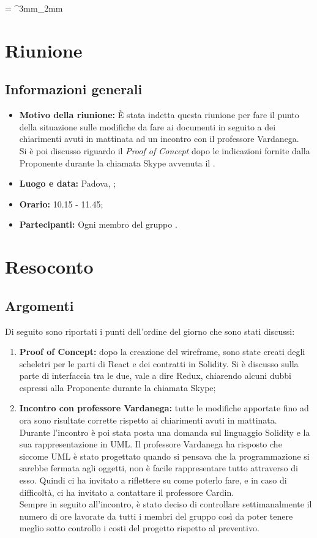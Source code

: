 \documentclass[VER-2018-02-19.tex]{subfiles}
\begin{document}
\tabulinesep = ^3mm_2mm
\chapter{Riunione}
\section{Informazioni generali}
\begin{itemize}
	\item \textbf{Motivo della riunione:} \`{E} stata indetta questa riunione per fare il punto della situazione sulle modifiche da fare ai documenti in seguito a dei chiarimenti avuti in mattinata ad un incontro con il professore Vardanega. \\
	Si è poi discusso riguardo il \textit{Proof of Concept} dopo le indicazioni fornite dalla Proponente durante la chiamata Skype avvenuta il .
	\item \textbf{Luogo e data:} Padova, ;
	\item \textbf{Orario:} 10.15 - 11.45;
	\item \textbf{Partecipanti:} Ogni membro del gruppo \gruppo.
\end{itemize}


\chapter{Resoconto}

\section{Argomenti}
Di seguito sono riportati i punti dell'ordine del giorno che sono stati discussi:
\begin{enumerate}
	\item \textbf{Proof of Concept:} dopo la creazione del wireframe, sono state creati degli scheletri per le parti di React e dei contratti in Solidity. Si è discusso sulla parte di interfaccia tra le due, vale a dire Redux, chiarendo alcuni dubbi espressi alla Proponente durante la chiamata Skype;
	\item \textbf{Incontro con professore Vardanega:} tutte le modifiche apportate fino ad ora sono risultate corrette rispetto ai chiarimenti avuti in mattinata.\\
	Durante l'incontro è poi stata posta una domanda sul linguaggio Solidity e la sua rappresentazione in UML. Il professore Vardanega ha risposto che siccome UML è stato progettato quando si pensava che la programmazione si sarebbe fermata agli oggetti, non è facile rappresentare tutto attraverso di esso. Quindi ci ha invitato a riflettere su come poterlo fare, e in caso di difficoltà, ci ha invitato a contattare il professore Cardin.\\
	Sempre in seguito all'incontro, è stato deciso di controllare settimanalmente il numero di ore lavorate da tutti i membri del gruppo così da poter tenere meglio sotto controllo i costi del progetto rispetto al preventivo.
\end{enumerate}
\end{document}
